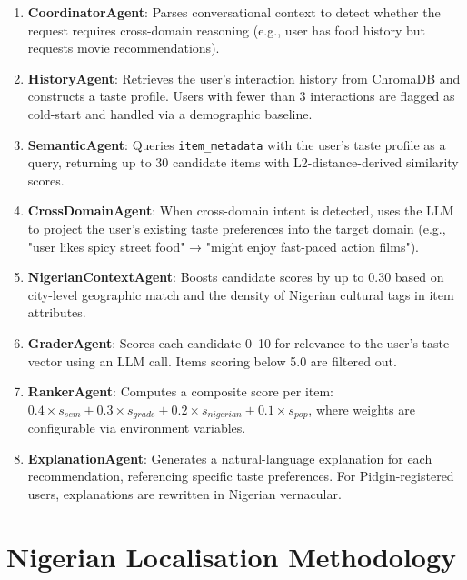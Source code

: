 \documentclass[11pt,a4paper]{article}
\begin{document}
\begin{enumerate}[leftmargin=*, label=\textbf{\arabic*.}]
    \item \textbf{CoordinatorAgent}: Parses conversational context to detect whether the request requires cross-domain reasoning (e.g., user has food history but requests movie recommendations).

    \item \textbf{HistoryAgent}: Retrieves the user's interaction history from ChromaDB and constructs a taste profile. Users with fewer than 3 interactions are flagged as cold-start and handled via a demographic baseline.

    \item \textbf{SemanticAgent}: Queries \texttt{item\_metadata} with the user's taste profile as a query, returning up to 30 candidate items with L2-distance-derived similarity scores.

    \item \textbf{CrossDomainAgent}: When cross-domain intent is detected, uses the LLM to project the user's existing taste preferences into the target domain (e.g., "user likes spicy street food" → "might enjoy fast-paced action films").

    \item \textbf{NigerianContextAgent}: Boosts candidate scores by up to 0.30 based on city-level geographic match and the density of Nigerian cultural tags in item attributes.

    \item \textbf{GraderAgent}: Scores each candidate 0–10 for relevance to the user's taste vector using an LLM call. Items scoring below 5.0 are filtered out.

    \item \textbf{RankerAgent}: Computes a composite score per item: $0.4 \times s_{sem} + 0.3 \times s_{grade} + 0.2 \times s_{nigerian} + 0.1 \times s_{pop}$, where weights are configurable via environment variables.

    \item \textbf{ExplanationAgent}: Generates a natural-language explanation for each recommendation, referencing specific taste preferences. For Pidgin-registered users, explanations are rewritten in Nigerian vernacular.
\end{enumerate}

\section{Nigerian Localisation Methodology}
\end{document}
